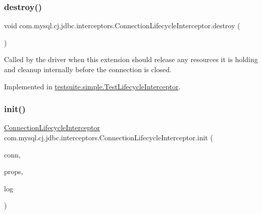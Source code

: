 \mbox{\label{interfacecom_1_1mysql_1_1cj_1_1jdbc_1_1interceptors_1_1_connection_lifecycle_interceptor_a33d706a19850fdc02c89b2e5f70cb2f5}} 
\subsubsection{\texorpdfstring{destroy()}{destroy()}}
{\footnotesize\ttfamily void com.\+mysql.\+cj.\+jdbc.\+interceptors.\+Connection\+Lifecycle\+Interceptor.\+destroy (\begin{DoxyParamCaption}{ }\end{DoxyParamCaption})}

Called by the driver when this extension should release any resources it is holding and cleanup internally before the connection is closed. 

Implemented in \mbox{\hyperlink{classtestsuite_1_1simple_1_1_test_lifecycle_interceptor_a2a1a99507005bb6d901d3782880aac09}{testsuite.\+simple.\+Test\+Lifecycle\+Interceptor}}.

\mbox{\label{interfacecom_1_1mysql_1_1cj_1_1jdbc_1_1interceptors_1_1_connection_lifecycle_interceptor_ab4de7e32506946459d6b3e68c5d0ea6b}} 
\subsubsection{\texorpdfstring{init()}{init()}}
{\footnotesize\ttfamily \mbox{\hyperlink{interfacecom_1_1mysql_1_1cj_1_1jdbc_1_1interceptors_1_1_connection_lifecycle_interceptor}{Connection\+Lifecycle\+Interceptor}} com.\+mysql.\+cj.\+jdbc.\+interceptors.\+Connection\+Lifecycle\+Interceptor.\+init (\begin{DoxyParamCaption}\item[{\mbox{\hyperlink{interfacecom_1_1mysql_1_1cj_1_1_mysql_connection}{Mysql\+Connection}}}]{conn,  }\item[{Properties}]{props,  }\item[{\mbox{\hyperlink{interfacecom_1_1mysql_1_1cj_1_1log_1_1_log}{Log}}}]{log }\end{DoxyParamCaption})}

